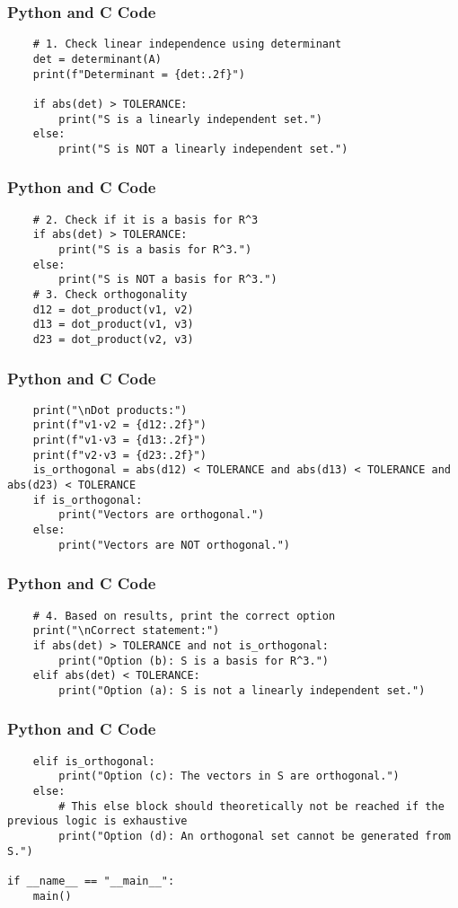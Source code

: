 \documentclass{beamer}
\begin{document}
\begin{frame}[fragile]
\frametitle{Python and C Code}
\begin{lstlisting}  
    # 1. Check linear independence using determinant
    det = determinant(A)
    print(f"Determinant = {det:.2f}")

    if abs(det) > TOLERANCE:
        print("S is a linearly independent set.")
    else:
        print("S is NOT a linearly independent set.")
\end{lstlisting}
\end{frame}

\begin{frame}[fragile]
\frametitle{Python and C Code}
\begin{lstlisting}
    # 2. Check if it is a basis for R^3
    if abs(det) > TOLERANCE:
        print("S is a basis for R^3.")
    else:
        print("S is NOT a basis for R^3.")
    # 3. Check orthogonality
    d12 = dot_product(v1, v2)
    d13 = dot_product(v1, v3)
    d23 = dot_product(v2, v3)
\end{lstlisting}
\end{frame}

\begin{frame}[fragile]
\frametitle{Python and C Code}
\begin{lstlisting}
    print("\nDot products:")
    print(f"v1·v2 = {d12:.2f}")
    print(f"v1·v3 = {d13:.2f}")
    print(f"v2·v3 = {d23:.2f}")
    is_orthogonal = abs(d12) < TOLERANCE and abs(d13) < TOLERANCE and abs(d23) < TOLERANCE
    if is_orthogonal:
        print("Vectors are orthogonal.")
    else:
        print("Vectors are NOT orthogonal.")
\end{lstlisting}
\end{frame}

\begin{frame}[fragile]
\frametitle{Python and C Code}
\begin{lstlisting}
    # 4. Based on results, print the correct option
    print("\nCorrect statement:")
    if abs(det) > TOLERANCE and not is_orthogonal:
        print("Option (b): S is a basis for R^3.")
    elif abs(det) < TOLERANCE:
        print("Option (a): S is not a linearly independent set.")
\end{lstlisting}
\end{frame}

\begin{frame}[fragile]
\frametitle{Python and C Code}
\begin{lstlisting}
    elif is_orthogonal:
        print("Option (c): The vectors in S are orthogonal.")
    else:
        # This else block should theoretically not be reached if the previous logic is exhaustive
        print("Option (d): An orthogonal set cannot be generated from S.")

if __name__ == "__main__":
    main()
\end{lstlisting}
\end{frame}
\end{document}
